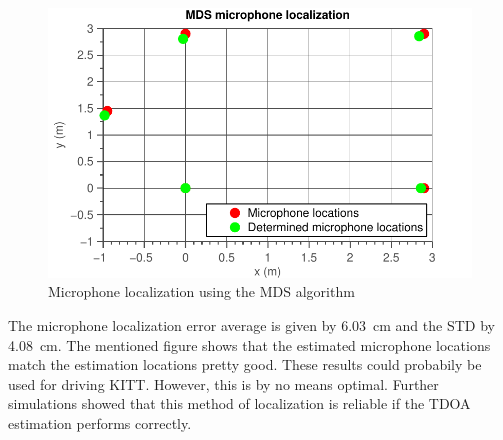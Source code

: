 \documentclass[11pt,titlepage]{report}
\begin{document}
\begin{figure}[H]
	\begin{center}
		\includegraphics[width=.6\linewidth]{../../deliverable-7-resources/figures/ass-2/report-9/ass-2-report-9.pdf}
	\end{center}
	\caption{Microphone localization using the MDS algorithm}
	\label{fig:ass-2-rep-9}
\end{figure}

The microphone localization error average is given by \SI{6.03}{cm} and the STD by \SI{4.08}{cm}. The mentioned figure shows that the estimated microphone locations match the estimation locations pretty good. These results could probabily be used for driving KITT. However, this is by no means optimal. Further simulations showed that this method of localization is reliable if the TDOA estimation performs correctly.


	
\end{document}
